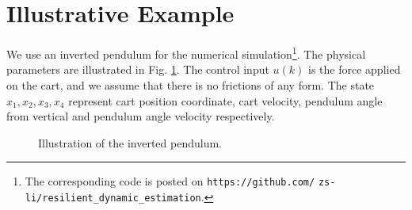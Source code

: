 \documentclass[12pt]{article}  %
\begin{document}
 





\section{Illustrative Example}\label{sec:sim}
We use an inverted pendulum for the numerical simulation\footnote{The corresponding code is posted on \texttt{https://github.com/} \texttt{zs-li/resilient\_dynamic\_estimation}.}. The physical parameters are illustrated in Fig. \ref{fig:invpen}. 
The control input $u(k)$ is the force applied on the cart, and we assume that there is no frictions of any form.
The state $x_1,x_2,x_3,x_4$ represent cart position coordinate, cart velocity, pendulum angle from vertical and pendulum angle velocity respectively. 
\begin{figure}[htpb]
	\centering
	
	\caption{Illustration of the inverted pendulum.}\label{fig:invpen}
\end{figure}
\end{document}
